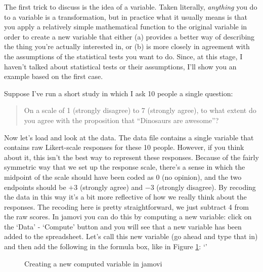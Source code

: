 
The first trick to discuss is the idea of  a variable. Taken literally, {\it anything} you do to a variable is a transformation, but in practice what it usually means is that you apply a relatively simple mathematical function to the original variable in order to create a new variable that either (a) provides a better way of describing the thing you're actually interested in, or (b) is more closely in agreement with the assumptions of the statistical tests you want to do.  Since, at this stage, I haven't talked about statistical tests or their assumptions, I'll show you an example based on the first case. 

Suppose I've run a short study in which I ask 10 people a single question: 
\begin{quote}
On a scale of 1 (strongly disagree) to 7 (strongly agree), to what extent do you agree with the proposition that ``Dinosaurs are awesome''?
\end{quote}
Now let's load and look at the data. The data file  contains a single variable that contains raw Likert-scale responses for these 10 people. However, if you think about it, this isn't the best way to represent these responses. Because of the fairly symmetric way that we set up the response scale, there's a sense in which the midpoint of the scale should have been coded as 0 (no opinion), and the two endpoints should be $+3$ (strongly agree) and $-3$ (strongly disagree). By recoding the data in this way it's a bit more reflective of how we really think about the responses. The recoding here is pretty straightforward, we just subtract 4 from the raw scores. In jamovi you can do this by computing a new variable: click on the `Data' - `Compute' button and you will see that a new variable has been added to the spreadsheet. Let's call this new variable  (go ahead and type that in) and then add the following in the formula box, like in Figure \ref{fig:likertraw}: `' 

\vspace{0.5cm}
\begin{figure}[htb]
\begin{center}
\caption{Creating a new computed variable in jamovi}
\label{fig:likertraw}
\HR
\end{center}
\end{figure}
\newpage

